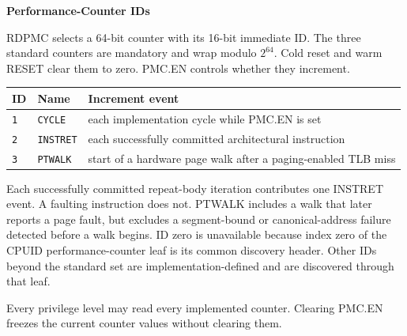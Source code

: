 \textbf{Performance-Counter IDs}\par
RDPMC selects a 64-bit counter with its 16-bit immediate ID. The three standard counters are mandatory and wrap
modulo $2^{64}$. Cold reset and warm RESET clear them to zero. PMC.EN controls whether they increment.

\Needspace{1.25in}
\begingroup\footnotesize
\setlength{\aboverulesep}{0pt}
\setlength{\belowrulesep}{0pt}
\setlength{\extrarowheight}{1.2pt}
\begin{center}
\begin{tabularx}{\linewidth}{@{}>{\raggedright\arraybackslash}p{0.55in}>{\raggedright\arraybackslash}p{1.05in}>{\raggedright\arraybackslash}X@{}}
\toprule
\rowcolor{ManualHeaderFill}
\textbf{ID} & \textbf{Name} & \textbf{Increment event}\\
\midrule
\texttt{1} & \texttt{CYCLE} & each implementation cycle while PMC.EN is set\\
\texttt{2} & \texttt{INSTRET} & each successfully committed architectural instruction\\
\texttt{3} & \texttt{PTWALK} & start of a hardware page walk after a paging-enabled TLB miss\\
\bottomrule
\end{tabularx}
\end{center}
\endgroup

Each successfully committed repeat-body iteration contributes one INSTRET event. A faulting instruction does not.
PTWALK includes a walk that later reports a page fault, but excludes a segment-bound or canonical-address failure
detected before a walk begins. ID zero is unavailable because index zero of the CPUID performance-counter leaf is its
common discovery header. Other IDs beyond the standard set are implementation-defined and are discovered through that
leaf.

\begin{manualraggedblock}
Every privilege level may read every implemented counter. Clearing PMC.EN freezes the current counter values
without clearing them.
\end{manualraggedblock}
